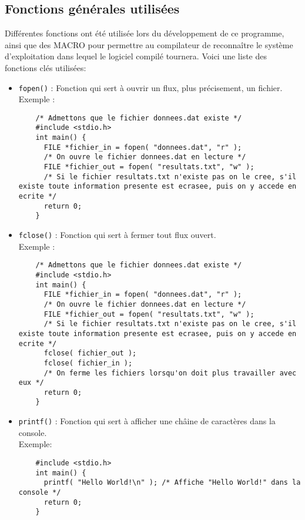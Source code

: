 \documentclass[10pt]{article}
\begin{document}
\subsection{Fonctions générales utilisées}
Différentes fonctions ont été utilisée lors du développement de ce programme, ainsi que des MACRO pour
permettre au compilateur de reconnaître le système d'exploitation dans lequel le logiciel compilé tournera.
Voici une liste des fonctions clés utilisées:
\begin{itemize}
  
\item \texttt{fopen()} : Fonction qui sert à ouvrir un flux, plus précisement, un fichier.\\
  Exemple :
  \begin{lstlisting}
    /* Admettons que le fichier donnees.dat existe */
    #include <stdio.h>
    int main() {
      FILE *fichier_in = fopen( "donnees.dat", "r" );
      /* On ouvre le fichier donnees.dat en lecture */
      FILE *fichier_out = fopen( "resultats.txt", "w" );
      /* Si le fichier resultats.txt n'existe pas on le cree, s'il existe toute information presente est ecrasee, puis on y accede en ecrite */
      return 0;
    }
  \end{lstlisting}

\item \texttt{fclose()} : Fonction qui sert à fermer tout flux ouvert.\\
  Exemple :
  \begin{lstlisting}
    /* Admettons que le fichier donnees.dat existe */
    #include <stdio.h>
    int main() {
      FILE *fichier_in = fopen( "donnees.dat", "r" );
      /* On ouvre le fichier donnees.dat en lecture */
      FILE *fichier_out = fopen( "resultats.txt", "w" );
      /* Si le fichier resultats.txt n'existe pas on le cree, s'il existe toute information presente est ecrasee, puis on y accede en ecrite */
      fclose( fichier_out );
      fclose( fichier_in );
      /* On ferme les fichiers lorsqu'on doit plus travailler avec eux */
      return 0;
    }
  \end{lstlisting}

  
\item \texttt{printf()} : Fonction qui sert à afficher une châine de caractères dans la console.\\
  Exemple:
  \begin{lstlisting}
    #include <stdio.h>
    int main() {
      printf( "Hello World!\n" ); /* Affiche "Hello World!" dans la console */
      return 0;
    }
  \end{lstlisting}
  

\end{itemize}
\end{document}
